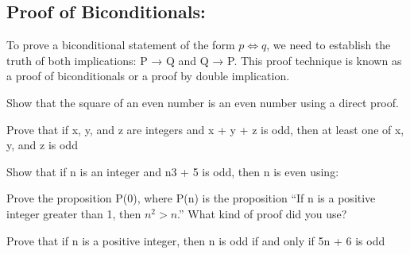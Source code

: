 \documentclass{exam}
\begin{document}
\subsection{Proof of Biconditionals:}
To prove a biconditional statement of the form  $p \iff q$, we need to establish the truth of both implications: P → Q and Q → P. This proof technique is known as a proof of biconditionals or a proof by double implication.

\vspace{1.5in}


\begin{questions}


\question Show that the square of an even number is an even number using a direct proof.
\vspace{4in}


\question Prove that if x, y, and z are integers and x + y + z is odd,
then at least one of x, y, and z is odd

\vspace{9in}
\question Show that if n is an integer and n3 + 5 is odd, then n is
even using:

\question Prove the proposition P(0), where P(n) is the proposition
“If n is a positive integer greater than 1, then $n^2 > n$.”
What kind of proof did you use?
\vspace{9in}


\question Prove that if n is a positive integer, then n is odd if and
only if 5n + 6 is odd
\vspace{9in}



\end{questions}
\end{document}

